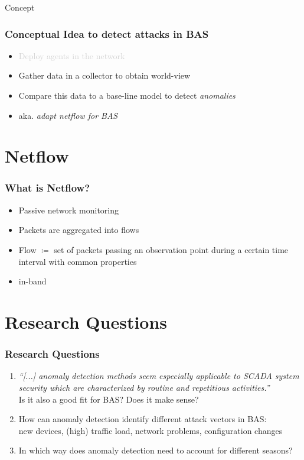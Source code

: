 \begin{frame}[c]
	\centering
	\LARGE Concept
\end{frame}

\begin{frame}[c]
\frametitle{Conceptual Idea to detect attacks in BAS}
\begin{itemize}
	\item \textcolor{lightgray}{Deploy agents in the network}
	\item Gather data in a collector to obtain world-view
	\item Compare this data to a base-line model to detect \textit{anomalies}
	\item aka. \textit{adapt netflow for BAS}
\end{itemize}
\end{frame}

\section{Netflow}
\begin{frame}[c]
	\frametitle{What is Netflow?}
	\begin{itemize}
		\item Passive network monitoring
		\item Packets are aggregated into flows \parencite{Hofstede2014}
		\item Flow $\coloneqq$ set of packets passing an observation point during a certain time interval with common properties \parencite{Claise2013}
		\item in-band
	\end{itemize}
\end{frame}

\section{Research Questions}
\begin{frame}[c]
	\frametitle{Research Questions}
	\begin{enumerate}
		\item \textit{\enquote{[...] anomaly detection methods seem especially applicable to SCADA system security which are characterized by routine and repetitious activities.}} \parencite{Yang2006}\\
			Is it also a good fit for BAS? Does it make sense?
		\item How can anomaly detection identify different attack vectors in BAS:\\
			{\small new devices, (high) traffic load, network problems, configuration changes}
		\item In which way does anomaly detection need to account for different seasons?
	\end{enumerate}
\end{frame}


